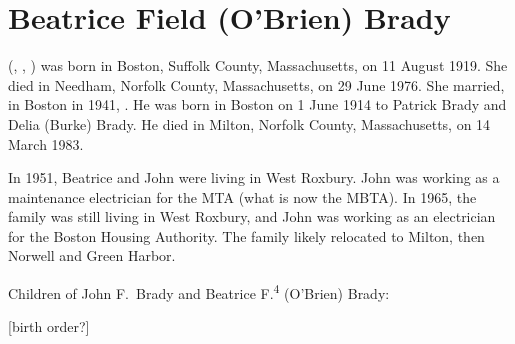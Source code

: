 \section{Beatrice Field (O'Brien) Brady}\label{per:Beatrice4OBrien}

 (, , ) was born in Boston, Suffolk County, Massachusetts, on 11 August 1919.\cite{Beatrice4OBrienBirth} She died in Needham, Norfolk County, Massachusetts, on 29 June 1976.\cite{Beatrice4OBrienDeath} She married, in Boston in 1941, .\cite{Beatrice4OBrienMarriage} He was born in Boston on 1 June 1914 to Patrick Brady and Delia (Burke) Brady.\cite{JohnBradyDraft,Census1920JohnBrady,PatrickBradyMarriage} He died in Milton, Norfolk County, Massachusetts, on 14 March 1983.\cite{JohnBradyDeath}

In 1951, Beatrice and John were living in West Roxbury. John was working as a maintenance electrician for the MTA (what is now the MBTA).\cite{JohnBrady1951,HistoryoftheT} In 1965, the family was still living in West Roxbury, and John was working as an electrician for the Boston Housing Authority.\cite{JohnBrady1965} The family likely relocated to Milton, then Norwell and Green Harbor.\cite{Beatrice4OBrienObit}

\begin{KidsIntro}
	Children of John F.\ Brady and Beatrice F.\textsuperscript{4} (O'Brien) Brady:
\end{KidsIntro}

\begin{Kids}
	
	
	
\end{Kids}

[birth order?]
